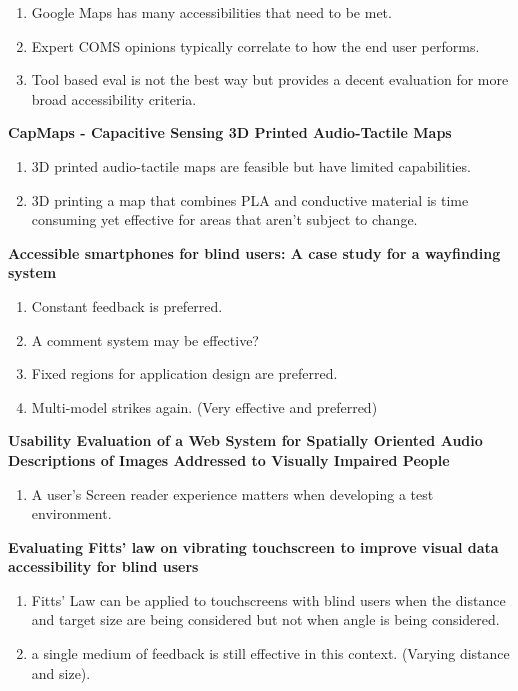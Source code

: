 \documentclass{article}
\begin{document}
\begin{enumerate}
    \item Google Maps has many accessibilities that need to be met. 
    \item Expert COMS opinions typically correlate to how the end user performs. 
    \item Tool based eval is not the best way but provides a decent evaluation for more broad accessibility criteria. 
\end{enumerate}

\cite{} \textbf{CapMaps - Capacitive Sensing 3D Printed Audio-Tactile Maps } \cite{}

\begin{enumerate}
    \item 3D printed audio-tactile maps are feasible but have limited capabilities. 
    \item 3D printing a map that combines PLA and conductive material is time consuming yet effective for areas that aren't subject to change. 
\end{enumerate}

\cite{} \textbf{Accessible smartphones for blind users: A case study for a wayfinding system } \cite{}

\begin{enumerate}
    \item Constant feedback is preferred.
    \item A comment system may be effective?
    \item Fixed regions for application design are preferred. 
    \item Multi-model strikes again. (Very effective and preferred) 
\end{enumerate}

\cite{} \textbf{Usability Evaluation of a Web System for Spatially Oriented Audio Descriptions of Images Addressed to Visually Impaired People } \cite{}

\begin{enumerate}
    \item A user's Screen reader experience matters when developing a test environment.
\end{enumerate}

\cite{} \textbf{Evaluating Fitts’ law on vibrating touchscreen to improve visual data accessibility for blind users } \cite{}

\begin{enumerate}
    \item Fitts' Law can be applied to touchscreens with blind users when the distance and target size are being considered but not when angle is being considered. 
    \item a single medium of feedback is still effective in this context. (Varying distance and size).
\end{enumerate}
\end{document}
